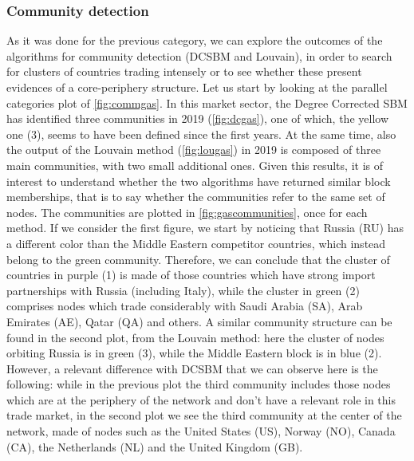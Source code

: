 \subsubsection*{Community detection}

As it was done for the previous category, we can explore the outcomes of the algorithms for community detection (DCSBM and Louvain), in order to search for clusters of countries trading intensely or to see whether these present evidences of a core-periphery structure. Let us start by looking at the parallel categories plot of \cref{fig:commgas}. In this market sector, the Degree Corrected SBM has identified three communities in 2019 (\cref{fig:dcgas}), one of which, the yellow one (3), seems to have been defined since the first years. At the same time, also the output of the Louvain method (\cref{fig:lougas}) in 2019 is composed of three main communities, with two small additional ones. Given this results, it is of interest to understand whether the two algorithms have returned similar block memberships, that is to say whether the communities refer to the same set of nodes. The communities are plotted in \cref{fig:gascommunities}, once for each method. If we consider the first figure, we start by noticing that Russia (RU) has a different color than the Middle Eastern competitor countries, which instead belong to the green community. Therefore, we can conclude that the cluster of countries in purple (1) is made of those countries which have strong import partnerships with Russia (including Italy), while the cluster in green (2) comprises nodes which trade considerably with Saudi Arabia (SA), Arab Emirates (AE), Qatar (QA) and others. A similar community structure can be found in the second plot, from the Louvain method: here the cluster of nodes orbiting Russia is in green (3), while the Middle Eastern block is in blue (2). However, a relevant difference with DCSBM that we can observe here is the following: while in the previous plot the third community includes those nodes which are at the periphery of the network and don't have a relevant role in this trade market, in the second plot we see the third community at the center of the network, made of nodes such as the United States (US), Norway (NO), Canada (CA), the Netherlands (NL) and the United Kingdom (GB).


